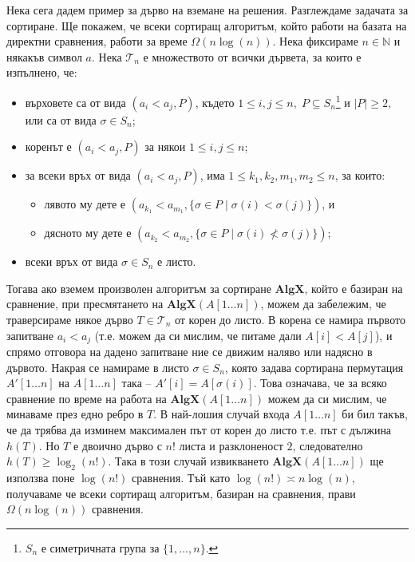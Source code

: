 \documentclass{article}
\newcommand{\N}{\mathbb{N}}
\newcommand{\calT}{\mathcal{T}}
\theoremstyle{definition}
\theoremstyle{plain}
\theoremstyle{remark}
\theoremstyle{definition}
\begin{document}
Нека сега дадем пример за дърво на вземане на решения.
Разглеждаме задачата за сортиране.
Ще покажем, че всеки сортиращ алгоритъм, който работи на базата на директни сравнения, работи за време $\Omega(n \log (n))$.
Нека фиксираме $n \in \N$ и някакъв символ $a$.
Нека $\calT_n$ е множеството от всички дървета, за които е изпълнено, че:
\begin{itemize}
    \item върховете са от вида $(a_i < a_j, P)$, където $1 \leq i, j \leq n, \; P \subseteq S_n$\footnote{$S_n$ е симетричната група за $\{ 1, \dots, n \}$.} и $|P| \geq 2$, или са от вида $\sigma \in S_n$;
    \item коренът е $(a_i < a_j, P)$ за някои $1 \leq i, j \leq n$;
    \item за всеки връх от вида $(a_i < a_j, P)$, има $1 \leq k_1, k_2, m_1, m_2 \leq n$, за които:
          \begin{itemize}
              \item лявото му дете е $(a_{k_1} < a_{m_1}, \{ \sigma \in P \mid \sigma(i) < \sigma(j) \})$, и
              \item дясното му дете е $(a_{k_2} < a_{m_2}, \{ \sigma \in P \mid \sigma(i) \not< \sigma(j) \})$;
          \end{itemize}
    \item всеки връх от вида $\sigma \in S_n$ е листо.
\end{itemize}
Тогава ако вземем произволен алгоритъм за сортиране $\mathbf{AlgX}$, който е базиран на сравнение, при пресмятането на $\mathbf{AlgX}(A[1 \dots n])$, можем да забележим, че траверсираме някое дърво $T \in \calT_n$ от корен до листо.
В корена се намира първото запитване $a_i < a_j$ (т.е. можем да си мислим, че питаме дали $A[i] < A[j]$), и спрямо отговора на дадено запитване ние се движим наляво или надясно в дървото.
Накрая се намираме в листо $\sigma \in S_n$, която задава сортирана пермутация $A'[1 \dots n]$ на $A[1 \dots n]$ така -- $A'[i] = A[\sigma(i)]$.
Това означава, че за всяко сравнение по време на работа на $\mathbf{AlgX}(A[1 \dots n])$ можем да си мислим, че минаваме през едно ребро в $T$.
В най-лошия случай входа $A[1 \dots n]$ би бил такъв, че да трябва да изминем максимален път от корен до листо т.е. път с дължина $h(T)$.
Но $T$ е двоично дърво с $n!$ листа и разклоненост $2$, следователно $h(T) \geq \log_2(n!)$.
Така в този случай извикването $\mathbf{AlgX}(A[1 \dots n])$ ще използва поне $\log(n!)$ сравнения.
Тъй като $\log(n!) \asymp n \log(n)$, получаваме че всеки сортиращ алгоритъм, базиран на сравнения, прави $\Omega(n \log(n))$ сравнения.
\end{document}
